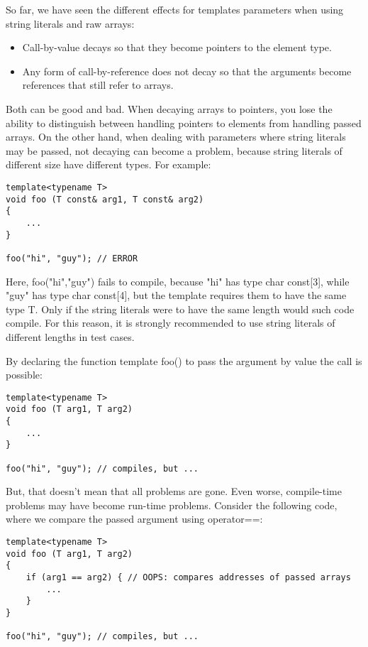 
So far, we have seen the different effects for templates parameters when using string literals and raw arrays:

\begin{itemize}
\item 
Call-by-value decays so that they become pointers to the element type.

\item 
Any form of call-by-reference does not decay so that the arguments become references that still refer to arrays.
\end{itemize}

Both can be good and bad. When decaying arrays to pointers, you lose the ability to distinguish between handling pointers to elements from handling passed arrays. On the other hand, when dealing with parameters where string literals may be passed, not decaying can become a problem, because string literals of different size have different types. For example:

\begin{lstlisting}[style=styleCXX]
template<typename T>
void foo (T const& arg1, T const& arg2)
{
	...
}

foo("hi", "guy"); // ERROR
\end{lstlisting}

Here, foo("hi","guy") fails to compile, because "hi" has type char const[3], while "guy" has type char const[4], but the template requires them to have the same type T. Only if the string literals were to have the same length would such code compile. For this reason, it is strongly recommended to use string literals of different lengths in test cases.

By declaring the function template foo() to pass the argument by value the call is possible:

\begin{lstlisting}[style=styleCXX]
template<typename T>
void foo (T arg1, T arg2)
{
	...
}

foo("hi", "guy"); // compiles, but ...
\end{lstlisting}

But, that doesn’t mean that all problems are gone. Even worse, compile-time problems may have become run-time problems. Consider the following code, where we compare the passed argument using operator==:

\begin{lstlisting}[style=styleCXX]
template<typename T>
void foo (T arg1, T arg2)
{
	if (arg1 == arg2) { // OOPS: compares addresses of passed arrays
		...
	}
}

foo("hi", "guy"); // compiles, but ...
\end{lstlisting}

